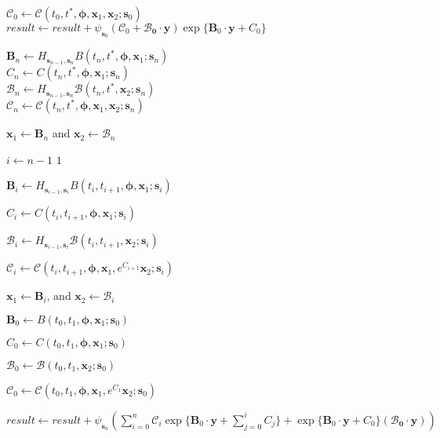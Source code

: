 \documentclass[11pt]{article}
\numberwithin{equation}{section}
\begin{document}
\begin{algorithm}
{{$\mathcal{C}_0\leftarrow \mathcal{C}\left(t_0,t^*, \boldsymbol{\phi},\mathbf{x}_1,\mathbf{x}_2;\mathbf{s}_0\right) $\\
$result\leftarrow result+ \psi_{\mathbf{s}_0}\left( \mathcal{C}_0+\boldsymbol{\mathcal{B}_0 \cdot \mathbf{y}}\right) \exp\{\mathbf{B}_0\cdot \mathbf{y}+ C_0 \}$}
{
$\mathbf{B}_{n} \leftarrow H_{\mathbf{s}_{n-1},\mathbf{s}_{n}}B\left(t_n,t^*,\boldsymbol{\phi}, \mathbf{x}_1;\mathbf{s}_n \right) $\\
$C_n\leftarrow C\left(t_n,t^*,\boldsymbol{\phi}, \mathbf{x}_1;\mathbf{s}_n \right) $\\
$\boldsymbol{\mathcal{B}}_{n} \leftarrow H_{\mathbf{s}_{n-1},\mathbf{s}_{n}}\mathcal{B}\left(t_n,t^*, \mathbf{x}_2;\mathbf{s}_n \right) $\\
$\mathcal{C}_n\leftarrow \mathcal{C}\left(t_n,t^*,\boldsymbol{\phi}, \mathbf{x}_1, \mathbf{x}_2;\mathbf{s}_n \right) $

$\mathbf{x}_1\leftarrow \mathbf{B}_n$ and $\mathbf{x}_2\leftarrow \boldsymbol{\mathcal{B}}_n$




\For%
{$i\leftarrow $$n-1$ \KwTo $1$}
{$\mathbf{B}_i \leftarrow H_{\mathbf{s}_{i-1},\mathbf{s}_{i}}   B\left(t_i,t_{i+1},\boldsymbol{\phi}, \mathbf{x}_1;\mathbf{s}_i \right) $
	
$C_i\leftarrow C\left(t_i,t_{i+1},\boldsymbol{\phi}, \mathbf{x}_1;\mathbf{s}_i \right) $

$\boldsymbol{\mathcal{B}}_i \leftarrow H_{\mathbf{s}_{i-1},\mathbf{s}_{i}}   \mathcal{B}\left(t_i,t_{i+1}, \mathbf{x}_2;\mathbf{s}_i \right) $

$\mathcal{C}_i\leftarrow \mathcal{C}\left(t_i,t_{i+1},\boldsymbol{\phi}, \mathbf{x}_1, e^{C_{i+1}}\mathbf{x}_2 ;\mathbf{s}_i \right) $
	
$\mathbf{x}_1\leftarrow \mathbf{B}_i$, and $\mathbf{x}_2\leftarrow \boldsymbol{\mathcal{B}}_i$}
$\mathbf{B}_0 \leftarrow B\left(t_0,t_1,\boldsymbol{\phi}, \mathbf{x}_1;\mathbf{s}_0 \right) $

$C_0\leftarrow C\left(t_0,t_1,\boldsymbol{\phi}, \mathbf{x}_1;\mathbf{s}_0 \right) $ 

$\boldsymbol{\mathcal{B}}_0 \leftarrow \mathcal{B}\left(t_0,t_{1}, \mathbf{x}_2;\mathbf{s}_0 \right) $

$\mathcal{C}_0\leftarrow \mathcal{C}\left(t_0,t_{1},\boldsymbol{\phi}, \mathbf{x}_1, e^{C_{1}}\mathbf{x}_2 ;\mathbf{s}_0 \right) $

$result\leftarrow result+ \psi_{\mathbf{s}_n}\left( \sum_{i=0}^{n} \mathcal{C}_i \exp \{\mathbf{B}_0\cdot \mathbf{y}+ \sum_{j=0}^{i} C_j\}+ \exp\{\mathbf{B}_0\cdot \mathbf{y} +C_0\}\left(\boldsymbol{\mathcal{B}_0 \cdot \mathbf{y}} \right)\right)  $





}


}


\label{algo:p2}
\end{algorithm}
\end{document}
